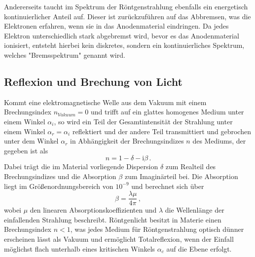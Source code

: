         Andererseits taucht im Spektrum der Röntgenstrahlung ebenfalls ein energetisch kontinuierlicher Anteil auf.
        Dieser ist zurückzuführen auf das Abbremsen, was die Elektronen erfahren, wenn sie in das Anodenmaterial eindringen.
        Da jedes Elektron unterschiedlich stark abgebremst wird, bevor es das Anodenmaterial ionisiert,
        entsteht hierbei kein diskretes, sondern ein kontinuierliches Spektrum, welches "Bremsspektrum" genannt wird.
    \subsection{Reflexion und Brechung von Licht}
        Kommt eine elektromagnetische Welle aus dem Vakuum mit einem Brechungsindex $n_{Vakuum}=0$ und trifft auf ein glattes homogenes Medium unter einem Winkel $\alpha_i$,
        so wird ein Teil der Gesamtintensität der Strahlung unter einem Winkel $\alpha_r=\alpha_i$ reflektiert und
        der andere Teil transmittiert und gebrochen unter dem Winkel $\alpha_r$ in Abhängigkeit der Brechungsindizes $n$
        des Mediums, der gegeben ist als
        \begin{equation}
            n=1-\delta - \text{i}\beta \, .
        \end{equation}
        Dabei trägt die im Material vorliegende Dispersion $\delta$ zum Realteil des Brechungsindizes und die Absorption $\beta$ zum Imaginärteil bei.
        Die Absorption liegt im Größenordnungsbereich von $10^{-9}$ und berechnet sich über
        \begin{equation}
            \beta = \frac{\lambda\mu}{4\pi} \, ,
            \label{eqn:beta}
        \end{equation}
        wobei $\mu$ den linearen Absorptionskoeffizienten und $\lambda$ die Wellenlänge der einfallenden Strahlung beschreibt.
        Röntgenlicht besitzt in Materie einen Brechungsindex $n<1$, was jedes Medium für Röntgenstrahlung optisch dünner erscheinen lässt als Vakuum
        und ermöglicht Totalreflexion, wenn der Einfall möglichst flach unterhalb eines kritischen Winkels $\alpha_c$ auf die Ebene erfolgt.

